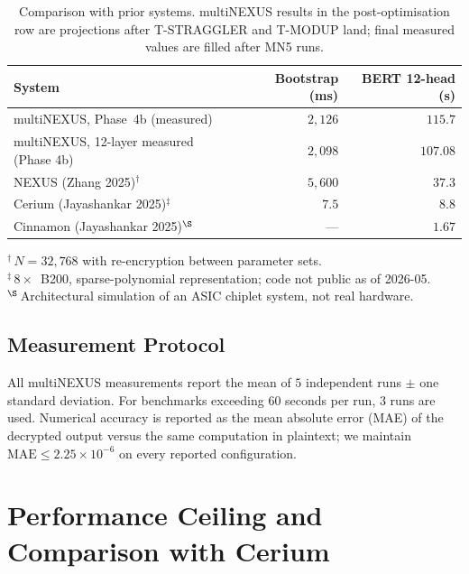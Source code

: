 \documentclass[conference]{IEEEtran}
\begin{document}
\begin{table}[h]
\centering
\caption{Comparison with prior systems. multiNEXUS results in the
post-optimisation row are projections after T-STRAGGLER and T-MODUP
land; final measured values are filled after MN5 runs.}
\label{tab:syscompare}
\begin{tabular}{lrr}
\toprule
System & Bootstrap (ms) & BERT 12-head (s) \\
\midrule
multiNEXUS, Phase~4b (measured)                              & $2{,}126$               & $115.7$        \\
multiNEXUS, 12-layer measured (Phase 4b)                     & $2{,}098$               & $107.08$ \\
NEXUS (Zhang 2025)$^{\dagger}$                               & $5{,}600$               & $37.3$         \\
Cerium (Jayashankar 2025)$^{\ddagger}$                       & $7.5$                   & $8.8$          \\
Cinnamon (Jayashankar 2025)$^{\S}$                           & ---                     & $1.67$         \\
\bottomrule
\end{tabular}

\smallskip
\footnotesize
$^{\dagger}$\,$N{=}32{,}768$ with re-encryption between parameter sets.\\
$^{\ddagger}$\,$8\times$~B200, sparse-polynomial representation; code
not public as of 2026-05.\\
$^{\S}$\,Architectural simulation of an ASIC chiplet system, not real
hardware.
\end{table}

\subsection{Measurement Protocol}

All multiNEXUS measurements report the mean of $5$ independent runs
$\pm$ one standard deviation. For benchmarks exceeding $60$ seconds
per run, $3$ runs are used. Numerical accuracy is reported as the mean
absolute error (MAE) of the decrypted output versus the same
computation in plaintext; we maintain
$\mathrm{MAE} \leq 2.25 \times 10^{-6}$ on every reported
configuration.

\section{Performance Ceiling and Comparison with Cerium}
\label{sec:ceiling}
\end{document}
